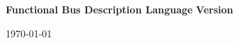 \thispagestyle{empty}

\vspace*{5cm}

\begin{center}
\textbf{\Huge Functional Bus Description Language}
\vspace{1cm}
\newline
\textbf{\Large Version \VersionNumber}
\par\end{center}{\Large \par}


\vfill

\begin{center}
\today
\par\end{center}{\large \par}

\newpage
